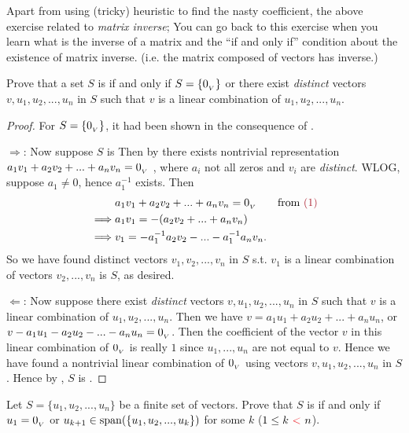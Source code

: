 \begin{note}
\TODOREF{} Apart from using (tricky) heuristic to find the nasty coefficient,
the above exercise related to \emph{matrix inverse};
You can go back to this exercise when you learn what is the inverse of a matrix and the ``if and only if'' condition about the existence of matrix inverse. (i.e. the matrix composed of \LID{} vectors has inverse.)
\end{note}

\begin{exercise} \label{exercise 1.5.14}
Prove that a set \(S\) is \LDP{} if and only if \(S = \{ 0_{_V} \}\) or there exist \emph{distinct} vectors \(v, u_1, u_2, ..., u_n\) in \(S\) such that \(v\) is a linear combination of \(u_1, u_2, ..., u_n\).
\end{exercise}

\begin{proof}
For \(S = \{ 0_{_V} \}\), it had been shown in the consequence of .

\(\Longrightarrow\):
Now suppose \(S\) is \LDP{}
Then by  there exists nontrivial representation \(a_1 v_1 + a_2 v_2 + ... + a_n v_n = 0_{_V}\) , where \(a_i\) not all zeros and \(v_i\) are \emph{distinct}.
WLOG, suppose \(a_1 \ne 0\), hence \(a_1^{-1}\) exists.
Then
\begin{align*}
             & a_1 v_1 + a_2 v_2 + ... + a_n v_n = \OV & \text{from \MAROON{(1)}} \\
    \implies & a_1 v_1 = -(a_2 v_2 + ... + a_n v_n) \\
    \implies & v_1 = -a_1^{-1} a_2 v_2 - ... - a_1^{-1} a_n v_n.
\end{align*}
So we have found distinct vectors \(v_1, v_2, ..., v_n\) in \(S\) s.t. \(v_1\) is a linear combination of vectors \(v_2, ..., v_n\) is \(S\), as desired.

\(\Longleftarrow\):
Now suppose there exist \emph{distinct} vectors \(v, u_1, u_2, ..., u_n\) in \(S\) such that \(v\) is a linear combination of \(u_1, u_2, ..., u_n\).
Then we have \(v = a_1 u_1 + a_2 u_2 + ... + a_n u_n\), or \(v - a_1 u_1 - a_2 u_2 - ... - a_n u_n = 0_{_V}\).
Then the coefficient of the vector \(v\) in this linear combination of \(0_{_V}\) is really \(1\) since \(u_1, ..., u_n\) are not equal to \(v\).
Hence we have found a nontrivial linear combination of \(0_{_V}\) using vectors \(v, u_1, u_2, ..., u_n\) in \(S\).
Hence by , \(S\) is \LDP{}.
\end{proof}

\begin{exercise} \label{exercise 1.5.15}
Let \(S = \{ u_1, u_2, ..., u_n \}\) be a finite set of vectors.
Prove that \(S\) is \LDP{} if and only if \(u_1 = 0_{_V}\) or \(u_{k + 1} \in \operatorname{span}(\{ u_1, u_2, ..., u_k \})\)
for some \(k\) (\(1 \le k\ \RED{<}\ n\)).
\end{exercise}


